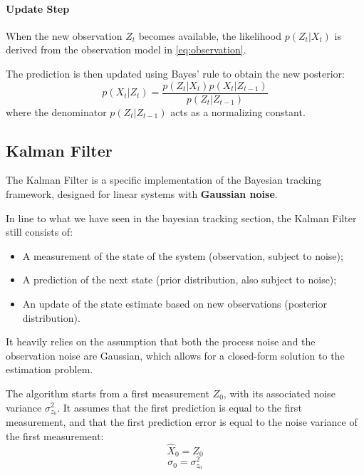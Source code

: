 \paragraph{Update Step}
When the new observation $Z_t$ becomes available, the likelihood $p(Z_t | X_t)$ is derived from the observation model in \ref{eq:observation}.

The prediction is then updated using Bayes' rule to obtain the new posterior:
$$p(X_t | Z_{t}) = \frac{p(Z_t | X_t) p(X_t | Z_{t-1})} {p(Z_t | Z_{t-1})}$$
where the denominator $p(Z_t | Z_{t-1})$ acts as a normalizing constant.

\subsection{Kalman Filter}
The Kalman Filter is a specific implementation of the Bayesian tracking framework, designed for linear systems with \textbf{Gaussian noise}.

In line to what we have seen in the bayesian tracking section, the Kalman Filter still consists of:
\begin{itemize}
    \item A measurement of the state of the system (observation, subject to noise);
    \item A prediction of the next state (prior distribution, also subject to noise);
    \item An update of the state estimate based on new observations (posterior distribution).
\end{itemize}
It heavily relies on the assumption that both the process noise and the observation noise are Gaussian, 
which allows for a closed-form solution to the estimation problem.

The algorithm starts from a first measurement $Z_0$, with its associated noise variance $\sigma_{z_0}^2$.
It assumes that the first prediction is equal to the first measurement, and that the first prediction error is equal to the noise variance of the first measurement:
$$\hat{X}_0 = Z_0$$
$$\sigma_0 = \sigma_{z_0}^2$$

